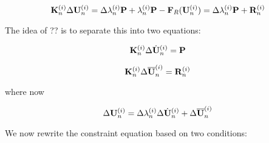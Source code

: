 \[
{\bf K}_n^{(i)} \Delta {\bf U}_n^{(i)} = \Delta \lambda_n^{(i)} {\bf P} +
\lambda_n^{(i)} {\bf P} - {\bf F}_R({\bf U}_n^{(i)}) = \Delta \lambda_n^{(i)} {\bf P} + {\bf R}_n^{(i)}
\]

\noindent The idea of ?? is to separate this into two equations:

\def\Uh{\dot{\bf U}}
\def\Ub{\overline{\bf U}}

\[
\K_n^{(i)} \Delta \Uh_n^{(i)} = \P
\]

\[
\K_n^{(i)} \Delta \Ub_n^{(i)} = \R_n^{(i)}
\]

\noindent where now

\begin{equation}
 \Delta \U_n^{(i)} = \Delta \lambda_n^{(i)} \Delta \Uh_n^{(i)} + \Delta \Ub_n^{(i)}  
\label{splitForm}
\end{equation}

\noindent We now rewrite the constraint equation based on two conditions:

